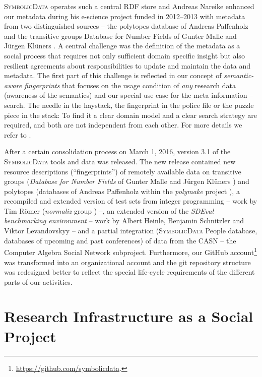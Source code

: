 \documentclass[12pt]{article}
\def\SD{\textsc{Sym\-bolic\-Data}}
\begin{document}
{\SD} operates such a central RDF store \cite{sdstore} and Andreas Nareike
enhanced our metadata during his e-science project funded in 2012--2013 with
metadata from two distinguished sources -- the polytopes database of Andreas
Paffenholz \cite{Paffenholz} and the transitive groups Database for Number
Fields of Gunter Malle and J\"urgen Kl\"uners \cite{MalleKlueners}.  A central
challenge was the definition of the metadata as a social process that requires
not only sufficient domain specific insight but also resilient agreements about
responsibilities to update and maintain the data and metadata.  The first part
of this challenge is reflected in our concept of \emph{semantic-aware
  fingerprints} that focuses on the usage condition of \emph{any} research data
(awareness of the semantics) and our special use case for the meta information
-- search. The needle in the haystack, the fingerprint in the police file or
the puzzle piece in the stack: To find it a clear domain model and a clear
search strategy are required, and both are not independent from each other.
For more details we refer to \cite{icms-16}.

After a certain consolidation process on March 1, 2016, version 3.1 of the
{\SD} tools and data was released. The new release contained new resource
descriptions (``fingerprints'') of remotely available data on transitive groups
(\emph{Database for Number Fields} of Gunter Malle and J\"urgen Kl\"uners
\cite{MalleKlueners}) and polytopes (databases of Andreas Paffenholz
\cite{Paffenholz} within the \emph{polymake} project \cite{polymake}), a
recompiled and extended version of test sets from integer programming -- work
by Tim R\"omer (\emph{normaliz} group \cite{normaliz}) --, an extended version
of the \emph{SDEval benchmarking environment} -- work by Albert Heinle,
Benjamin Schnitzler and Viktor Levandovskyy \cite{heinle-15} -- and a partial
integration ({\SD} People database, databases of upcoming and past conferences)
of data from the CASN -- the Computer Algebra Social Network subproject.
Furthermore, our GitHub
account\footnote{\url{https://github.com/symbolicdata}.} was transformed into
an organizational account and the git repository structure was redesigned
better to reflect the special life-cycle requirements of the different parts of
our activities.

\section{Research Infrastructure as a Social Project}
\end{document}
